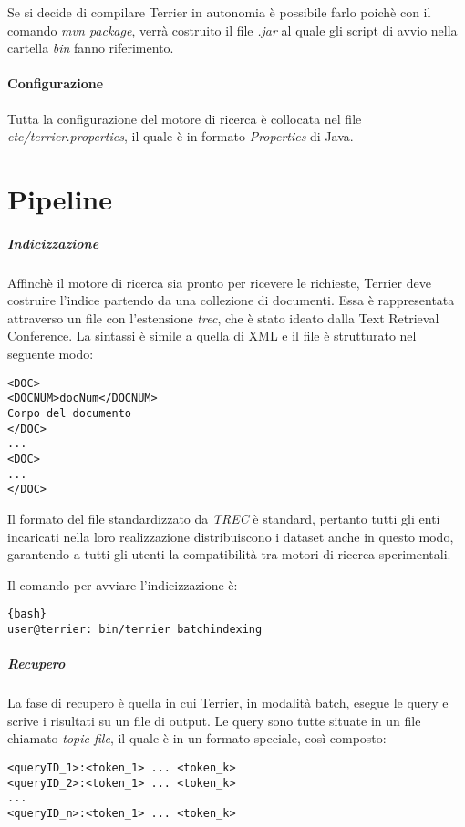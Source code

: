 Se si decide di compilare Terrier in autonomia è possibile farlo poichè con il comando \textit{mvn package},
verrà costruito il file \textit{.jar} al quale gli script di avvio nella cartella \textit{bin} fanno riferimento.

\paragraph{Configurazione}
Tutta la configurazione del motore di ricerca è collocata nel file \textit{etc/terrier.properties}, il quale
è in formato \textit{Properties} di Java.

\section{Pipeline}
\subparagraph{Indicizzazione} Affinchè il motore di ricerca sia pronto per ricevere le richieste,
Terrier deve costruire l'indice partendo da una collezione di documenti.
Essa è rappresentata attraverso un file con l'estensione \textit{trec},
che è stato ideato dalla Text Retrieval Conference.
La sintassi è simile a quella di XML e il file è strutturato nel seguente modo:

\begin{lstlisting}
<DOC>
<DOCNUM>docNum</DOCNUM>
Corpo del documento
</DOC>
...
<DOC>
...
</DOC>
\end{lstlisting}

Il formato del file standardizzato da \textit{TREC} è standard, pertanto tutti gli enti incaricati
nella loro realizzazione distribuiscono i dataset anche in questo
modo, garantendo a tutti gli utenti la compatibilità tra motori
di ricerca sperimentali.

Il comando per avviare l'indicizzazione è:

\begin{lstlisting}{bash}
user@terrier: bin/terrier batchindexing
\end{lstlisting}

\pagebreak

\subparagraph{Recupero}
La fase di recupero è quella in cui Terrier, in modalità batch, esegue le query
e scrive i risultati su un file di output.
Le query sono tutte situate in un file chiamato \textit{topic file}, il quale
è in un formato speciale, così composto:
\begin{lstlisting}
<queryID_1>:<token_1> ... <token_k>
<queryID_2>:<token_1> ... <token_k>
...
<queryID_n>:<token_1> ... <token_k>
\end{lstlisting}

